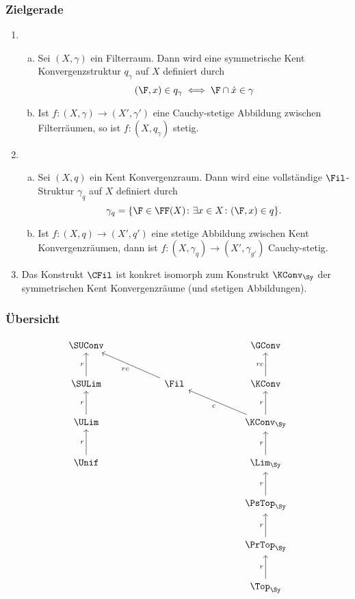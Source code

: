 \begin{frame}
  \frametitle{Zielgerade}
  \begin{enumerate}[1)]
    \item \begin{enumerate}[a)]  
        \item Sei $(X, \gamma)$ ein Filterraum. Dann wird eine symmetrische Kent Konvergenzstruktur $q_\gamma$ auf $X$ definiert durch
          $$
          (\F, x) \in q_\gamma \iff \F \cap \dot x \in \gamma
          $$
        \item Ist $f \colon (X, \gamma) \to (X', \gamma')$ eine Cauchy-stetige Abbildung zwischen Filterräumen, so ist $f \colon (X, q_\gamma)$ stetig.
      \end{enumerate}
    \item \begin{enumerate}[a)]
        \item Sei $(X, q)$ ein Kent Konvergenzraum. Dann wird eine vollständige $\Fil$-Struktur $\gamma_q$ auf $X$ definiert durch
          $$
          \gamma_q = \{ \F \in \FF(X) \colon \exists x \in X \colon (\F, x ) \in q \}.
          $$
        \item Ist $f \colon (X, q) \to (X', q')$ eine stetige Abbildung zwischen Kent Konvergenzräumen, dann ist $f \colon (X, \gamma_q) \to (X', \gamma_{g'})$ Cauchy-stetig.
      \end{enumerate}
    \item Das Konstrukt $\CFil$ ist konkret isomorph zum Konstrukt $\KConv_\Sy$ der symmetrischen Kent Konvergenzräume (und stetigen Abbildungen).
  \end{enumerate}
\end{frame}

\begin{frame}[fragile]
  \frametitle{Übersicht}
$$
\begin{tikzcd}[column sep=5.5em,row sep=2.5em]
  \SUConv              &        & \GConv \\
  \SULim \arrow[u,"r"] &  \Fil\arrow[lu,"rc"]  & \KConv   \arrow[u,"rc"] \\
  \ULim  \arrow[u,"r"] &        & \KConv_\Sy \arrow[lu,"c"]    \arrow[u,"r"]    \\
  \Unif  \arrow[u,"r"] &        & \Lim_\Sy   \arrow[u,"r"]    \\
                       &        & \PsTop_\Sy \arrow[u,"r"]    \\
                       &        & \PrTop_\Sy \arrow[u,"r"]    \\
                       &        & \Top_\Sy   \arrow[u,"r"]    
\end{tikzcd}
$$
\end{frame}

